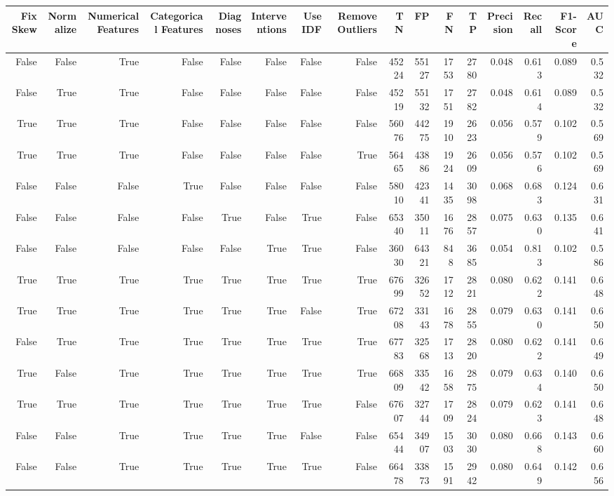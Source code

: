 \begin{tabular}{rrrrrrrrrrrrrrrr}
\toprule
Fix Skew & Normalize & Numerical Features & Categorical Features & Diagnoses & Interventions & Use IDF & Remove Outliers & TN & FP & FN & TP & Precision & Recall & F1-Score & AUC \\
\midrule
False & False & True & False & False & False & False & False & 45224 & 55127 & 1753 & 2780 & 0.048 & 0.613 & 0.089 & 0.532 \\
False & True & True & False & False & False & False & False & 45219 & 55132 & 1751 & 2782 & 0.048 & 0.614 & 0.089 & 0.532 \\
True & True & True & False & False & False & False & False & 56076 & 44275 & 1910 & 2623 & 0.056 & 0.579 & 0.102 & 0.569 \\
True & True & True & False & False & False & False & True & 56465 & 43886 & 1924 & 2609 & 0.056 & 0.576 & 0.102 & 0.569 \\
False & False & False & True & False & False & False & False & 58010 & 42341 & 1435 & 3098 & 0.068 & 0.683 & 0.124 & 0.631 \\
False & False & False & False & True & False & True & False & 65340 & 35011 & 1676 & 2857 & 0.075 & 0.630 & 0.135 & 0.641 \\
False & False & False & False & False & True & True & False & 36030 & 64321 & 848 & 3685 & 0.054 & 0.813 & 0.102 & 0.586 \\
True & True & True & True & True & True & True & True & 67699 & 32652 & 1712 & 2821 & 0.080 & 0.622 & 0.141 & 0.648 \\
True & True & True & True & True & True & False & True & 67208 & 33143 & 1678 & 2855 & 0.079 & 0.630 & 0.141 & 0.650 \\
False & True & True & True & True & True & True & True & 67783 & 32568 & 1713 & 2820 & 0.080 & 0.622 & 0.141 & 0.649 \\
True & False & True & True & True & True & True & True & 66809 & 33542 & 1658 & 2875 & 0.079 & 0.634 & 0.140 & 0.650 \\
True & True & True & True & True & True & True & False & 67607 & 32744 & 1709 & 2824 & 0.079 & 0.623 & 0.141 & 0.648 \\
False & False & True & True & True & True & False & False & 65444 & 34907 & 1503 & 3030 & 0.080 & 0.668 & 0.143 & 0.660 \\
False & False & True & True & True & True & True & False & 66478 & 33873 & 1591 & 2942 & 0.080 & 0.649 & 0.142 & 0.656 \\
\bottomrule
\end{tabular}
